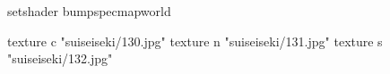 setshader bumpspecmapworld

    texture c "suiseiseki/130.jpg"
    texture n "suiseiseki/131.jpg"
    texture s "suiseiseki/132.jpg"
